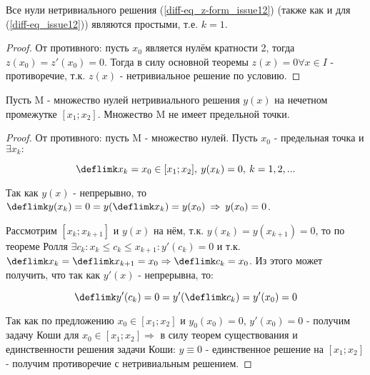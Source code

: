 \begin{lemma}\label{sol-zeros_issue12}
Все нули нетривиального решения (\ref{diff-eq_z-form_issue12}) (также как и для (\ref{diff-eq_issue12})) являются простыми, т.е. $k = 1$.
\end{lemma}

\begin{proof}
От противного: пусть $x_0$ является нулём кратности 2, тогда $z(x_0) = z'(x_0) = 0$. Тогда в силу основной теоремы $z(x) = 0 \forall x \in I$ - противоречие, т.к. $z(x)$ - нетривиальное решение по условию.
\end{proof}

\begin{lemma}\label{sol-set_issue12}
Пусть M - множество нулей нетривиального решения $y(x)$ на нечетном промежутке $[x_1;x_2]$. Множество M не имеет предельной точки.
\end{lemma}

\begin{proof}
От противного: пусть M - множество нулей. Пусть $x_0$ - предельная точка и $\exists {x_k} :$ 

\[\deflimk x_k = x_0 \in [x_1;x_2], \: y(x_k) = 0, \: k = 1,2,...\]

Так как $y(x)$ - непрерывно, то $\deflimk y(x_k) = 0 = y (\deflimk x_k) = y(x_0) \: \Rightarrow \: y(x_0) = 0$.

Рассмотрим $[x_k;x_{k+1}]$ и $y(x)$ на нём, т.к. $y(x_k) = y(x_{k+1}) = 0$, то по теореме Ролля $\exists c_k: x_k \leq c_k \leq x_{k+1}: y'(c_k) = 0$ и т.к. $\deflimk x_k = \deflimk x_{k+1} = x_0 \Rightarrow \deflimk c_k = x_0$. Из этого может получить, что так как $y'(x)$ - непрерывна, то:

\[\deflimk y' (c_k) = 0 = y' (\deflimk c_k) = y'(x_0) = 0\]

Так как по предложению $x_0 \in [x_1;x_2]$ и $y_0(x_0) = 0$, $y'(x_0) = 0$ - получим задачу Коши для $x_0 \in [x_1;x_2] \Rightarrow$ в силу теорем существования и единственности решения задачи Коши: $y\equiv 0$ - единственное решение на $[x_1;x_2]$ - получим противоречие с нетривиальным решением.
\end{proof}

